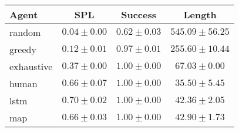 \begin{tabular}{lccc}
    \toprule
    Agent & SPL & Success & Length \\
    \midrule
    random & $0.04 \pm 0.00$ & $0.62 \pm 0.03$ & $545.09 \pm 56.25$\\
    greedy & $0.12 \pm 0.01$ & $0.97 \pm 0.01$ & $255.60 \pm 10.44$\\
    exhaustive & $0.37 \pm 0.00$ & $1.00 \pm 0.00$ & $67.03 \pm 0.00$\\
    human & $0.66 \pm 0.07$ & $1.00 \pm 0.00$ & $35.50 \pm 5.45$\\
    lstm & $0.70 \pm 0.02$ & $1.00 \pm 0.00$ & $42.36 \pm 2.05$\\
    map & $0.66 \pm 0.03$ & $1.00 \pm 0.00$ & $42.90 \pm 1.73$\\
    \bottomrule
\end{tabular}